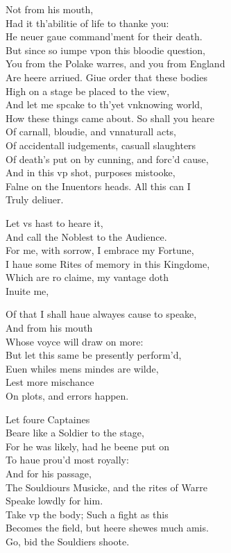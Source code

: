 \documentclass[a5paper,DIV=calc,11pt]{scrbook}
\begin{document}
\begin{drama*}
    \horspeaks Not from his mouth,\\
    Had it th'abilitie of life to thanke you:\\
    He neuer gaue command'ment for their death.\\
    But since so iumpe vpon this bloodie question,\\
    You from the Polake warres, and you from England\\
    Are heere arriued. Giue order that these bodies\\
    High on a stage be placed to the view,\\
    And let me spcake to th'yet vnknowing world,\\
    How these things came about. So shall you heare\\
    Of carnall, bloudie, and vnnaturall acts,\\
    Of accidentall iudgements, casuall slaughters\\
    Of death's put on by cunning, and forc'd cause,\\
    And in this vp shot, purposes mistooke,\\
    Falne on the Inuentors heads. All this can I\\
    Truly deliuer.
    
    \forspeaks Let vs hast to heare it,\\
    And call the Noblest to the Audience.\\
    For me, with sorrow, I embrace my Fortune,\\
    I haue some Rites of memory in this Kingdome,\\
    Which are ro claime, my vantage doth\\
    Inuite me,
    
    \horspeaks Of that I shall haue alwayes cause to speake,\\
    And from his mouth\\
    Whose voyce will draw on more:\\
    But let this same be presently perform'd,\\
    Euen whiles mens mindes are wilde,\\
    Lest more mischance\\
    On plots, and errors happen.
    
    \forspeaks Let foure Captaines\\
    Beare \ham like a Soldier to the stage,\\
    For he was likely, had he beene put on\\
    To haue prou'd most royally:\\
    And for his passage,\\
    The Souldiours Musicke, and the rites of Warre\\
    Speake lowdly for him.\\
    Take vp the body; Such a fight as this\\
    Becomes the field, but heere shewes much amis.\\
    Go, bid the Souldiers shoote.
    
\end{drama*}
\end{document}
